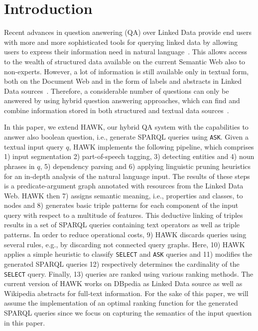 \documentclass{llncs}
\begin{document}
\section{Introduction}
Recent advances in question answering (QA) over Linked Data provide end users with more and more sophisticated tools for querying linked data by allowing users to express their information need in natural language~\cite{SINA_WebSemantic,tbsl,pythia}. 
This allows access to the wealth of structured data available on the current Semantic Web also to non-experts. However, a lot of information is still available only in textual form, both on the Document Web and in the form of labels and abstracts in Linked Data sources~\cite{rdflivenews}.
Therefore, a considerable number of questions can only be answered by using hybrid question answering approaches, which  can find and combine information stored in both structured and textual data sources~\cite{combiningLDandIR}.

In this paper, we extend HAWK, our hybrid QA system with the capabilities to answer also boolean question, i.e., generate SPARQL queries using \texttt{ASK}.  %
Given a textual input query $q$, HAWK implements the following pipeline, which comprises 1) input segmentation 2) part-of-speech tagging, 3) detecting entities and 4) noun phrases in $q$, 5) dependency parsing and 6) applying linguistic pruning heuristics for an in-depth analysis of the natural language input. 
The results of these steps is a predicate-argument graph annotated with resources from the Linked Data Web. HAWK then 7) assigns semantic meaning, i.e., properties and classes, to nodes and 8) generates basic triple patterns for each component of the input query with respect to a multitude of features. 
This deductive linking of triples results in a set of SPARQL queries containing text operators as well as triple patterns.
In order to reduce operational costs, 9) HAWK discards queries using several rules, e.g., by discarding not connected query graphs.
Here, 10) HAWK applies a simple heuristic to classify \texttt{SELECT} and \texttt{ASK} queries and 11) modifies the generated SPARQL queries 12) respectively determines the cardinality of the \texttt{SELECT} query.
Finally, 13) queries are ranked using various ranking methods.
The current version of HAWK works on DBpedia as Linked Data source as well as Wikipedia abstracts for full-text information. 
For the sake of this paper, we will assume the implementation of an optimal ranking function for the generated SPARQL queries since we focus on capturing the semantics of the input question in this paper. 
\end{document}
